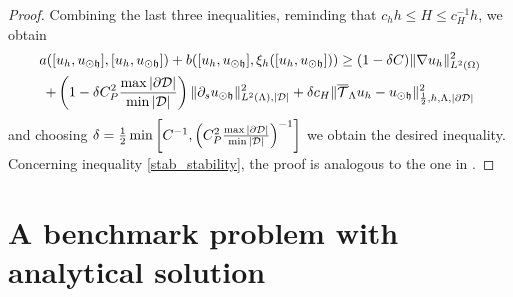 \documentclass[r]{siamart171218}
\begin{document}
\begin{proof}
{%
Combining the last three inequalities, reminding that $c_h h\leq H \leq c_H^{-1}h$, 
we obtain
\begin{multline*}
a([u_h, u_{\odot \mathfrak{h}}],[u_h, u_{\odot \mathfrak{h}}] ) + b([u_h, u_{\odot \mathfrak{h}}], \xi_h([u_h, u_{\odot \mathfrak{h}}]))
\geq (1-\delta C) \|\nabla u_h\|^2_{L^2(\Omega)} 
\\
+ \left(1- \delta C_P^2 \frac{\max |\partial\mathcal{D}|}{\min |\mathcal{D}|}\right) \|\partial_s u_{\odot \mathfrak{h}}\|^2_{L^2(\Lambda), |\mathcal{D}|}
+\delta c_H  \|{\overline{\mathcal{T}}_\Lambda} u_h-u_{\odot \mathfrak{h}}\|^2_{\frac 12,h,\Lambda, |\partial\mathcal{D}|}
\end{multline*}
and choosing $\delta=\frac{1}{2}\min\left[C^{-1}, \left(C_P^2 \frac{\max |\partial\mathcal{D}|}{\min |\mathcal{D}|}\right)^{-1}\right]$ we obtain the desired inequality.}\\
Concerning inequality \eqref{stab_stability}, the proof is analogous to the one in \cite{burman2014}.
\end{proof}



\section{A benchmark problem with analytical solution}
\end{document}
